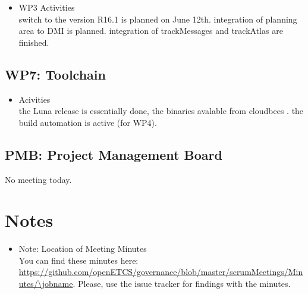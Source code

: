 \documentclass[a4paper, 11pt]{article}
\begin{document}
\begin{itemize}
\item WP3 Activities\\
switch to the version R16.1 is planned   on June 12th. 
integration of planning area to DMI is planned.
integration of trackMessages and trackAtlas are finished.

\end{itemize}

\subsection{WP7: Toolchain}

\begin{itemize}
\item Acivities\\
the Luna release is essentially done, the binaries avalable from cloudbees .
the build automation is active (for WP4).
\end{itemize}

\subsection{PMB: Project Management Board}

 No meeting today.

\section{Notes}
\begin{itemize}

\item Note: Location of Meeting Minutes\\
You can find these minutes here: \url{https://github.com/openETCS/governance/blob/master/scrumMeetings/Minutes/\jobname}. Please, use the issue tracker for findings with the minutes.

\end{itemize}
\end{document}
